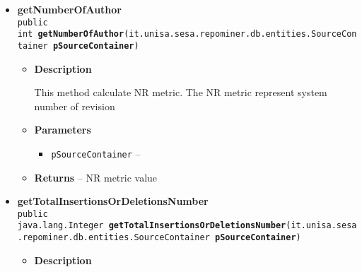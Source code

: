 {{{{{{{\begin{itemize}
{\begin{itemize}
{This method calculate mean\_NREF metric. The mean\_NREF metric represent mean number of file changes in a package caused by refactoring operation
}
\item{
{\bf  Parameters}
  \begin{itemize}
   \item{
\texttt{pSourceContainer} -- }
  \end{itemize}
}%
\item{{\bf  Returns} -- 
mean\_NREF metric value 
}%
\end{itemize}
}%
\item{ 
\hypertarget{it.unisa.sesa.repominer.metrics.PackageMetrics.getNumberOfAuthor(it.unisa.sesa.repominer.db.entities.SourceContainer)}{{\bf  getNumberOfAuthor}\\}
\texttt{public int\ {\bf  getNumberOfAuthor}(\texttt{it.unisa.sesa.repominer.db.entities.SourceContainer} {\bf  pSourceContainer})
\label{it.unisa.sesa.repominer.metrics.PackageMetrics.getNumberOfAuthor(it.unisa.sesa.repominer.db.entities.SourceContainer)}}%
\begin{itemize}
\item{
{\bf  Description}

This method calculate NR metric. The NR metric represent system number of revision
}
\item{
{\bf  Parameters}
  \begin{itemize}
   \item{
\texttt{pSourceContainer} -- }
  \end{itemize}
}%
\item{{\bf  Returns} -- 
NR metric value 
}%
\end{itemize}
}%
\item{ 
\hypertarget{it.unisa.sesa.repominer.metrics.PackageMetrics.getTotalInsertionsOrDeletionsNumber(it.unisa.sesa.repominer.db.entities.SourceContainer)}{{\bf  getTotalInsertionsOrDeletionsNumber}\\}
\texttt{public java.lang.Integer\ {\bf  getTotalInsertionsOrDeletionsNumber}(\texttt{it.unisa.sesa.repominer.db.entities.SourceContainer} {\bf  pSourceContainer})
\label{it.unisa.sesa.repominer.metrics.PackageMetrics.getTotalInsertionsOrDeletionsNumber(it.unisa.sesa.repominer.db.entities.SourceContainer)}}%
\begin{itemize}
\item{
{\bf  Description}

}
\end{itemize}}
\end{itemize}}}}}}}}
